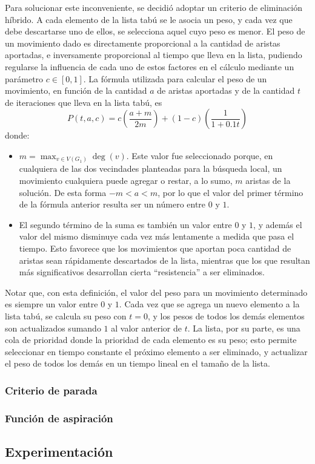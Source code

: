 Para solucionar este inconveniente, se decidió adoptar un criterio de
eliminación híbrido. A cada elemento de la lista tabú se le asocia un peso, y
cada vez que debe descartarse uno de ellos, se selecciona aquel cuyo peso es
menor. El peso de un movimiento dado es directamente proporcional a la
cantidad de aristas aportadas, e inversamente proporcional al tiempo que lleva
en la lista, pudiendo regularse la influencia de cada uno de estos factores en
el cálculo mediante un parámetro $c \in [0,1]$. La fórmula utilizada para
calcular el peso de un movimiento, en función de la cantidad $a$ de aristas
aportadas y de la cantidad $t$ de iteraciones que lleva en la lista tabú, es
\[ P(t,a,c) = c \left( \frac{a + m} {2 m} \right) + (1-c) \left(\frac{1}{1+0.1t} \right) \]
donde:
\begin{itemize}
    \item $m = \max_{v \in V(G_1)} \deg(v)$. Este valor fue seleccionado
    porque, en cualquiera de las dos vecindades planteadas para la búsqueda
    local, un movimiento cualquiera puede agregar o restar, a lo sumo, $m$
    aristas de la solución. De esta forma $-m < a < m$, por lo que el valor
    del primer término de la fórmula anterior resulta ser un número entre $0$
    y $1$.
    \item El segundo término de la suma es también un valor entre $0$ y $1$, y
    además el valor del mismo disminuye cada vez más lentamente a medida que
    pasa el tiempo. Esto favorece que los movimientos que aportan poca
    cantidad de aristas sean rápidamente descartados de la lista, mientras que
    los que resultan más significativos desarrollan cierta ``resistencia'' a
    ser eliminados.
\end{itemize}

Notar que, con esta definición, el valor del peso para un movimiento
determinado es siempre un valor entre $0$ y $1$. Cada vez que se agrega un
nuevo elemento a la lista tabú, se calcula su peso con $t = 0$, y los pesos de
todos los demás elementos son actualizados sumando $1$ al valor anterior de
$t$. La lista, por su parte, es una cola de prioridad donde la prioridad de
cada elemento es su peso; esto permite seleccionar en tiempo constante el
próximo elemento a ser eliminado, y actualizar el peso de todos los demás en
un tiempo lineal en el tamaño de la lista.

\subsubsection{Criterio de parada}

\subsubsection{Función de aspiración}

\subsection{Experimentación}
